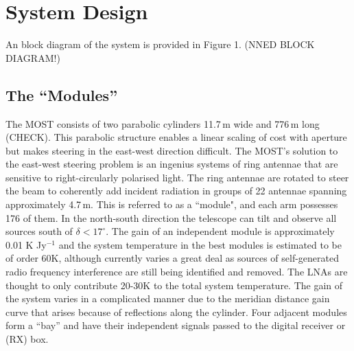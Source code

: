 \section{System Design}

An block diagram of the system is provided in Figure 1. (NNED BLOCK DIAGRAM!)

\subsection{The ``Modules''}
The MOST consists of two parabolic cylinders 11.7\,m wide and 776\,m long (CHECK). This parabolic structure enables a linear scaling of cost with aperture but makes steering in the east-west direction difficult. The MOST's solution to the east-west steering problem is an ingenius systems of ring antennae that are sensitive to right-circularly polarised light. The ring antennae are rotated to steer the beam to coherently add incident radiation in groups of 22 antennae spanning approximately 4.7\,m. This is referred to as a ``module", and each arm possesses 176 of them. In the north-south direction the telescope can tilt and observe all sources south of $\delta<17^\circ$. The gain of an independent module is approximately 0.01 K Jy$^{-1}$ and the system temperature in the best modules is estimated to be of order 60K, although currently varies a great deal as sources of self-generated radio frequency interference are still being identified and removed. The LNAs are thought to only contribute 20-30K to the total system temperature.
The gain of the system varies in a complicated manner due to the meridian distance gain curve that arises because of reflections along the cylinder\cite{Hunstead_1996}.
Four adjacent modules form a ``bay'' and have their independent signals passed to the digital receiver or (RX) box.
